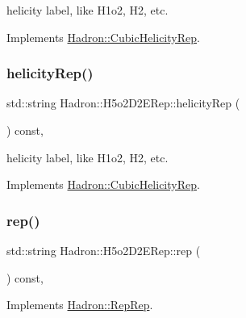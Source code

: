 helicity label, like H1o2, H2, etc. 

Implements \mbox{\hyperlink{structHadron_1_1CubicHelicityRep_af1096946b7470edf0a55451cc662f231}{Hadron\+::\+Cubic\+Helicity\+Rep}}.

\mbox{\label{structHadron_1_1H5o2D2ERep_a88ae729517bb24fb9254ad77081633af}} 
\subsubsection{\texorpdfstring{helicityRep()}{helicityRep()}\hspace{0.1cm}{\footnotesize\ttfamily [2/2]}}
{\footnotesize\ttfamily std\+::string Hadron\+::\+H5o2\+D2\+E\+Rep\+::helicity\+Rep (\begin{DoxyParamCaption}{ }\end{DoxyParamCaption}) const\hspace{0.3cm}{\ttfamily [inline]}, {\ttfamily [virtual]}}

helicity label, like H1o2, H2, etc. 

Implements \mbox{\hyperlink{structHadron_1_1CubicHelicityRep_af1096946b7470edf0a55451cc662f231}{Hadron\+::\+Cubic\+Helicity\+Rep}}.

\mbox{\label{structHadron_1_1H5o2D2ERep_a114f378ebe8c306a6530f530da8ac8d1}} 
\subsubsection{\texorpdfstring{rep()}{rep()}\hspace{0.1cm}{\footnotesize\ttfamily [1/3]}}
{\footnotesize\ttfamily std\+::string Hadron\+::\+H5o2\+D2\+E\+Rep\+::rep (\begin{DoxyParamCaption}{ }\end{DoxyParamCaption}) const\hspace{0.3cm}{\ttfamily [inline]}, {\ttfamily [virtual]}}



Implements \mbox{\hyperlink{structHadron_1_1RepRep_ab3213025f6de249f7095892109575fde}{Hadron\+::\+Rep\+Rep}}.

\mbox{\label{structHadron_1_1H5o2D2ERep_a114f378ebe8c306a6530f530da8ac8d1}} 
